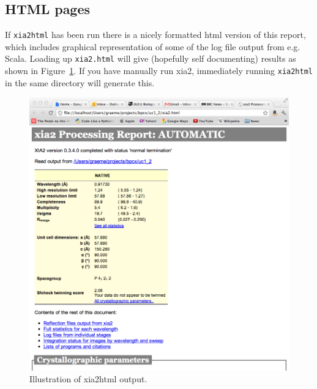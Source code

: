 \documentclass[a4paper, 11pt]{article}
\newif\ifpdf
\begin{document}
\subsection{HTML pages}

If \verb|xia2html| has been run there is a nicely formatted html
version of this report, which includes graphical representation of
some of the log file output from e.g. Scala. Loading up
\verb|xia2.html| will give (hopefully self documenting) results as
shown in Figure~\ref{figure-xia2html}. If you have manually run xia2,
immediately running \verb|xia2html| in the same directory will generate this.

\begin{figure}
\caption{Illustration of xia2html output.\label{figure-xia2html}}
\begin{center}
\ifpdf
  \includegraphics[scale=0.25]{figures/xia2html.png}
\else

\end{center}
\end{figure}
\end{document}
